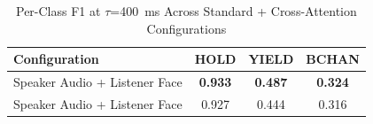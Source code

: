 \begin{table}[h]
\caption{Per-Class F1 at $\tau$=400~ms Across Standard + Cross-Attention Configurations}
\label{tab:f1_per_class_sca}
\small
\renewcommand{\arraystretch}{1.20}
\begin{tabular}{>{\raggedright\arraybackslash}p{4cm}ccc}
\toprule
Configuration & HOLD & YIELD & BCHAN \\
\midrule
Speaker Audio + Listener Face & \textbf{0.933} & \textbf{0.487} & \textbf{0.324} \\
Speaker Audio + Listener Face & 0.927 & 0.444 & 0.316 \\
\bottomrule
\end{tabular}
\end{table}
